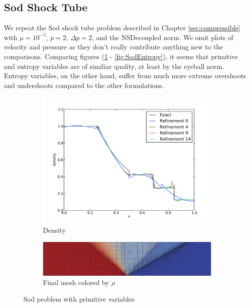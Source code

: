 \documentclass[Dissertation.tex]{subfiles}
\begin{document}
\subsection{Sod Shock Tube}
We repeat the Sod shock tube problem described in Chapter \ref{sec:compressible} with $\mu=10^{-5}$,
$p=2$, $\Delta p=2$, and the NSDecoupled norm.
We omit plots of velocity and pressure as they don't really contribute anything new to the comparisons.
Comparing figures (\ref{fig:SodPrimitive} - \ref{fig:SodEntropy}), it seems that
primitive and entropy variables are of similiar quality, at least by the eyeball norm.
Entropy variables, on the other hand, suffer from much more extreme overshoots and 
undershoots compared to the other formulations.

\begin{figure}[ht]
\centering
\begin{subfigure}[t]{\textwidth}
\centering
\includegraphics[width=\textwidth]{Dissertation/Sod/FormulationComparison/primitive-den.pdf}
\caption{Density}
\end{subfigure}
\begin{subfigure}[t]{0.9\textwidth}
\centering
\includegraphics[width=\textwidth]{Sod/FormulationComparison/Form0Mesh15.png}
\caption{Final mesh colored by $\rho$}
\end{subfigure}
\caption{Sod problem with primitive variables}
\label{fig:SodPrimitive}
\end{figure}
\end{document}
